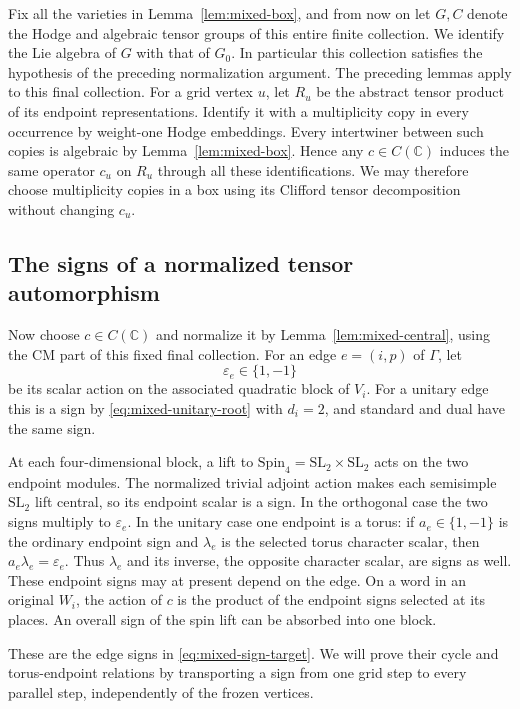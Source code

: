 \documentclass[11pt]{article}
\numberwithin{equation}{section}
\theoremstyle{definition}
\theoremstyle{remark}
\newcommand{\C}{\mathbb C}
\begin{document}
Fix all the varieties in Lemma~\ref{lem:mixed-box}, and from now on
let $G,C$ denote the Hodge and algebraic tensor groups of this entire
finite collection.  We identify the Lie algebra of $G$ with that
of $G_0$.  In particular this collection satisfies the hypothesis
of the preceding normalization argument.  The preceding lemmas apply
to this final collection.
For a grid vertex $u$, let $R_u$ be the abstract tensor product of
its endpoint representations.  Identify it with a multiplicity copy
in every occurrence by weight-one Hodge embeddings.  Every
intertwiner between such copies is algebraic by
Lemma~\ref{lem:mixed-box}.  Hence any $c\in C(\C)$ induces the
same operator $c_u$ on $R_u$ through all these identifications.
We may therefore choose multiplicity copies in a box using its
Clifford tensor decomposition without changing $c_u$.

\subsection{The signs of a normalized tensor automorphism}

Now choose $c\in C(\C)$ and normalize it by
Lemma~\ref{lem:mixed-central}, using the CM part of this fixed final
collection.  For an edge $e=(i,p)$ of $\Gamma$,
let
\[
 \varepsilon_e\in\{1,-1\}
\]
be its scalar action on the associated quadratic block of $V_i$.
For a unitary edge this is a sign by
\eqref{eq:mixed-unitary-root} with $d_i=2$, and standard and dual
have the same sign.

At each four-dimensional block, a lift to
$\mathrm{Spin}_4=\mathrm{SL}_2\times\mathrm{SL}_2$ acts on the
two endpoint modules.  The normalized trivial adjoint action makes
each semisimple $\mathrm{SL}_2$ lift central, so its endpoint scalar
is a sign.  In the orthogonal case the two signs multiply to
$\varepsilon_e$.  In the unitary case one endpoint is a torus:
if $a_e\in\{1,-1\}$ is the ordinary endpoint sign and $\lambda_e$
is the selected torus character scalar, then
$a_e\lambda_e=\varepsilon_e$.  Thus $\lambda_e$ and its inverse,
the opposite character scalar, are signs as well.
These endpoint signs may at present
depend on the edge.  On a word in an original $W_i$, the action of
$c$ is the product of the endpoint signs selected at its places.
An overall sign of the spin lift can be absorbed into one block.

These are the edge signs in \eqref{eq:mixed-sign-target}.  We will
prove their cycle and torus-endpoint relations by transporting a sign
from one grid step to every parallel step, independently of the frozen
vertices.
\end{document}
